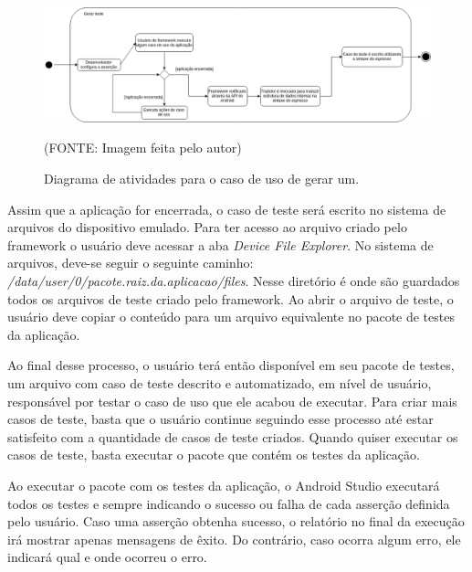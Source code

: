 \documentclass[
    12pt,       %
    openright,      %
    twoside,      %
    a4paper,      %
    english,      %
    french,       %
    spanish,      %
    brazil,       %
    ]{abntex2}
\begin{document}
        \begin{figure}[htbp]
          \begin{center}
            \includegraphics[width=1.0\textwidth]{img/capuccinoActivity.png}
              \end{center}
            \caption{\label{fig:passaro} Diagrama de atividades para o caso de uso de gerar um.}
          \begin{center}(FONTE: Imagem feita pelo autor)\end{center}
        \end{figure}

        Assim que a aplicação for encerrada, o caso de teste será escrito no sistema de arquivos do dispositivo
        emulado. Para ter acesso ao arquivo criado pelo framework o usuário deve acessar a aba
        \textit{Device File Explorer}. No sistema de arquivos, deve-se seguir o seguinte caminho:
        \textit{/data/user/0/pacote.raiz.da.aplicacao/files}. Nesse diretório é onde são guardados todos os
        arquivos de teste criado pelo framework. Ao abrir o arquivo de teste, o usuário deve copiar o conteúdo
        para um arquivo equivalente no pacote de testes da aplicação.

        Ao final desse processo, o usuário terá então disponível em seu pacote de testes, um arquivo com caso
        de teste descrito e automatizado, em nível de usuário, responsável por testar o caso de uso que ele
        acabou de executar. Para criar mais casos de teste, basta que o usuário continue seguindo esse
        processo até estar satisfeito com a quantidade de casos de teste criados. Quando quiser executar
        os casos de teste, basta executar o pacote que contém os testes da aplicação.

        Ao executar o pacote com os testes da aplicação, o Android Studio executará todos os testes e sempre
        indicando o sucesso ou falha de cada asserção definida pelo usuário. Caso uma asserção obtenha sucesso,
        o relatório no final da execução irá mostrar apenas mensagens de êxito. Do contrário, caso ocorra algum
        erro, ele indicará qual e onde ocorreu o erro.
\end{document}

